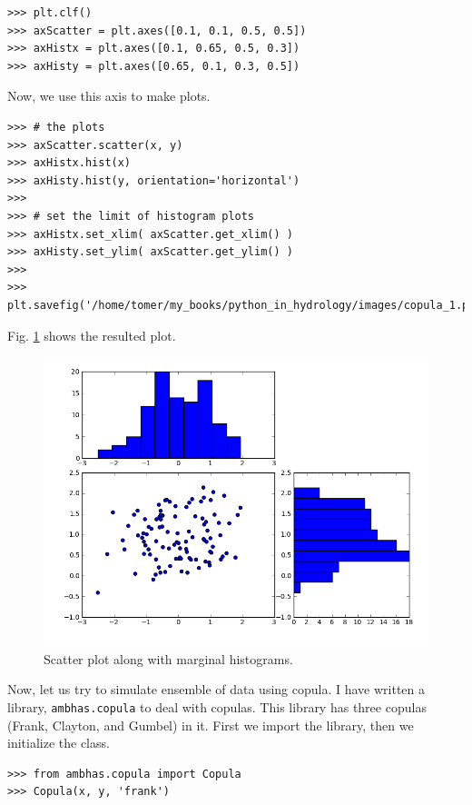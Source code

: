 \documentclass[10pt]{book}
\begin{document}
\beforeverb \begin{verbatim}
>>> plt.clf()
>>> axScatter = plt.axes([0.1, 0.1, 0.5, 0.5])
>>> axHistx = plt.axes([0.1, 0.65, 0.5, 0.3])
>>> axHisty = plt.axes([0.65, 0.1, 0.3, 0.5])
\end{verbatim} \afterverb

Now, we use this axis to make plots. 
\beforeverb \begin{verbatim}
>>> # the plots
>>> axScatter.scatter(x, y)
>>> axHistx.hist(x)
>>> axHisty.hist(y, orientation='horizontal')
>>> 
>>> # set the limit of histogram plots
>>> axHistx.set_xlim( axScatter.get_xlim() )
>>> axHisty.set_ylim( axScatter.get_ylim() )
>>> 
>>> plt.savefig('/home/tomer/my_books/python_in_hydrology/images/copula_1.png')
\end{verbatim} \afterverb

Fig. \ref{fig:copula1} shows the resulted plot. 
\beforefig
\begin{figure}[h!]
  \centering
    \includegraphics[scale=0.5]{images/copula_1.png}
  \caption{Scatter plot along with marginal histograms.}
   \label{fig:copula1}
\end{figure}
\afterfig

Now, let us try to simulate ensemble of data using copula. I have written a library, \verb"ambhas.copula" to deal with copulas. This library has three copulas (Frank, Clayton, and Gumbel) in it. First we import the library, then we initialize the class. 

\beforeverb \begin{verbatim}
>>> from ambhas.copula import Copula
>>> Copula(x, y, 'frank')
\end{verbatim} \afterverb
\end{document}

